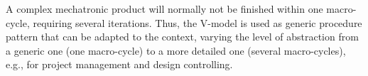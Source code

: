 A complex mechatronic product will normally not be finished within one
macro-cycle, requiring several iterations.
Thus,
the V-model is used as generic procedure pattern that can be adapted to the
context, varying the level of abstraction from a generic one (one macro-cycle)
to a more detailed one (several macro-cycles), e.g., for project management and
design controlling.

%

